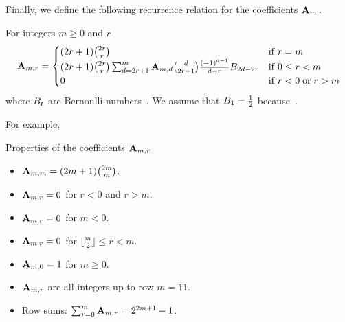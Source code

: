 Finally, we define the following recurrence relation for the coefficients ${\mathbf{A}} \sb{m,r}$
\begin{proposition}
    For integers $m\geq0$ and $r$
    \label{prop:coefficients_a}
    \begin{align*}
        {\mathbf{A}} \sb{m,r} =
        \begin{cases}
        (2r+1)
            \binom{2r}{r} & \mathrm{if} \; r=m \\
            (2r+1) \binom{2r}{r} \sum_{d = 2r+1}^{m} {\mathbf{A}} \sb{m,d} \binom{d}{2r+1} \frac{(-1)^{d-1}}{d-r}
            {B}\sb{2d-2r} & \mathrm{if} \; 0 \leq r<m \\
            0 & \mathrm{if} \; r<0 \; \mathrm{or} \; r>m
        \end{cases}
    \end{align*}
    where ${B}\sb{t}$ are Bernoulli numbers~\cite{weisstein2002bernoulli}.
    We assume that ${B}\sb{1}=\frac{1}{2}$ because~\cite{luschny2020introduction,luschny2021manifesto}.
\end{proposition}
For example,

Properties of the coefficients ${\mathbf{A}} \sb{m,r}$
\begin{itemize}
    \item ${\mathbf{A}} \sb{m,m} = (2m+1)\binom{2m}{m}$.
    \item ${\mathbf{A}} \sb{m,r} = 0$ for $r < 0$ and $r > m$.
    \item ${\mathbf{A}} \sb{m,r} = 0$ for $m < 0$.
    \item ${\mathbf{A}} \sb{m,r} = 0$ for $\lfloor \frac{m}{2} \rfloor \leq r < m$.
    \item ${\mathbf{A}} \sb{m,0} = 1$ for $m \geq 0$.
    \item ${\mathbf{A}} \sb{m,r}$ are all integers up to row $m = 11$.
    \item Row sums: $\sum_{r=0}^{m} {\mathbf{A}} \sb{m,r} = 2^{2m+1} - 1$.
\end{itemize}
